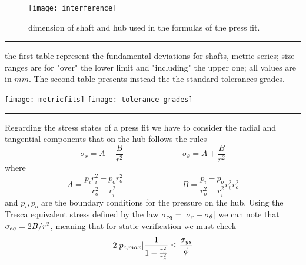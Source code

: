 	\begin{figure}[bht]
		\centering \texttt{[image: interference]}
		\caption{dimension of shaft and hub used in the formulas of the press fit.}
	\end{figure}

	\begin{table}[p]
		\centering \rule{0.9\linewidth}{1pt}
		\caption{the first table represent the fundamental deviations for shafts, metric series; size ranges are for "over" the lower limit and "including" the upper one; all values are in $mm$. The second table presents instead the the standard tolerances grades.}
		\label{tab:metricfits}
		\texttt{[image: metricfits]}
		\texttt{[image: tolerance-grades]}
		\rule{0.9\linewidth}{1pt}
	\end{table}

	Regarding the stress states of a press fit we have to consider the radial and tangential components that on the hub follows the rules
	\begin{equation} \label{eq:pressstress}
		\sigma_r = A - \frac B {r^2} \hspace{3cm} \sigma_\theta = A + \frac B {r^2}
	\end{equation}
	where
	\[ A = \frac{p_i r_i^2 - p_or_o^2}{r_o^2-r_i^2} \hspace{3cm} B = \frac{p_i-p_o}{r_o^2-r_i^2} r_i^2r_o^2 \]
	and $p_i,p_o$ are the boundary conditions for the pressure on the hub. Using the Tresca equivalent stress defined by the law $\sigma_{eq} = |\sigma_r - \sigma_\theta|$ we can note that $\sigma_{eq} = 2 B/r^2$, meaning that for static verification we must check
	\begin{equation} \label{eq:maxinterference}
		2 |p_{c,max}| \frac 1 {1- \frac{r_c^2}{r_o^2}} \leq \frac{\sigma_{ys}}{\phi}
	\end{equation}
	
	
	
	
	
	
	
	
	
	
	
	
	
	
	
	
	
	
	
	
	
	
	
	
	
	
	
	
	
